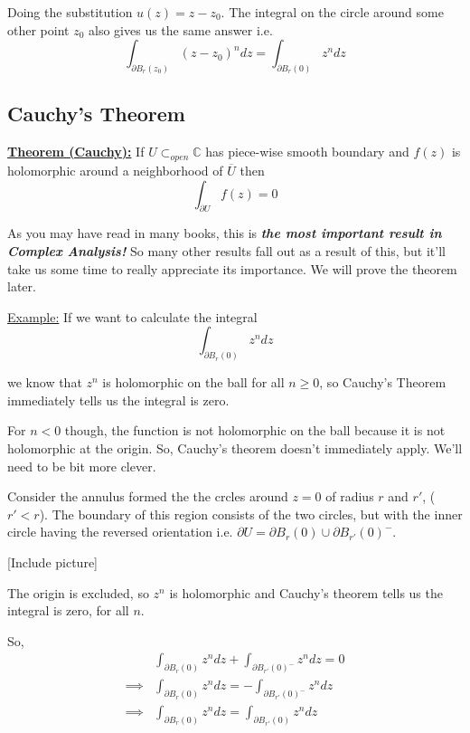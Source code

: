 \documentclass{article}
\newcommand{\C}{\mathbb{C}}
\begin{document}
\vskip 0.5cm
Doing the substitution $u(z) = z - z_0$. The integral on the circle around some other point $z_0$ also gives us the same answer i.e. 
\[ \int_{\partial B_r(z_0)} (z - z_0)^n dz = \int_{\partial B_r(0)} z^n dz \]

\vskip 1cm
\subsection{Cauchy's Theorem}

\vskip 0.5cm
\begin{mathdefinitionbox}{}
  \underline{\textbf{Theorem (Cauchy):}} If $U \subset_{open} \C$ has piece-wise smooth boundary and $f(z)$ is holomorphic around a neighborhood of $\overline{U}$ then 
  \[ \int_{\partial U} f(z) = 0 \] 
\end{mathdefinitionbox}

\vskip 0.5cm
As you may have read in many books, this is \emph{\textbf{the most important result in Complex Analysis!}} So many other results fall out as a result of this, but it'll take us some time to really appreciate its importance. We will prove the theorem later.

\vskip 0.5cm
\underline{Example:} If we want to calculate the integral
\[ \int_{\partial B_r(0)} z^n dz \]

we know that $z^n$ is holomorphic on the ball for all $n \geq 0$, so Cauchy's Theorem immediately tells us the integral is zero.

\vskip 0.5cm
For $n < 0$ though, the function is not holomorphic on the ball because it is not holomorphic at the origin. So, Cauchy's theorem doesn't immediately apply. We'll need to be bit more clever.

\vskip 0.5cm
Consider the annulus formed the the crcles around $z = 0$ of radius $r$ and $r'$, ($r' < r$). The boundary of this region consists of the two circles, but with the inner circle having the reversed orientation i.e. $\partial U = \partial B_r(0) \cup \partial B_{r'}(0)^{-}$.

\vskip 0.5cm
[Include picture]

\vskip 0.5cm
The origin is excluded, so $z^n$ is holomorphic and Cauchy's theorem tells us the integral is zero, for all $n$.

\vskip 0.5cm
So, 
\begin{align*}
  &\int_{\partial B_r(0)} z^n dz + \int_{\partial B_{r'}(0)^{-}} z^n dz = 0 \\
  \implies&\int_{\partial B_r(0)} z^n dz = - \int_{\partial B_{r'}(0)^{-}} z^n dz \\
  \implies& \boxed{\int_{\partial B_r(0)} z^n dz = \int_{\partial B_{r'}(0)} z^n dz }
\end{align*}
\end{document}
